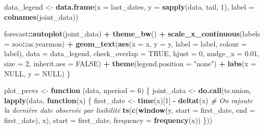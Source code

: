 \documentclass[
  12pt,
  a4paper,french]{article}
\newenvironment{Shaded}{\begin{snugshade}}{\end{snugshade}}
\newcommand{\AttributeTok}[1]{\textcolor[rgb]{0.13,0.29,0.53}{#1}}
\newcommand{\CommentTok}[1]{\textcolor[rgb]{0.56,0.35,0.01}{\textit{#1}}}
\newcommand{\ConstantTok}[1]{\textcolor[rgb]{0.56,0.35,0.01}{#1}}
\newcommand{\ControlFlowTok}[1]{\textcolor[rgb]{0.13,0.29,0.53}{\textbf{#1}}}
\newcommand{\DecValTok}[1]{\textcolor[rgb]{0.00,0.00,0.81}{#1}}
\newcommand{\FloatTok}[1]{\textcolor[rgb]{0.00,0.00,0.81}{#1}}
\newcommand{\FunctionTok}[1]{\textcolor[rgb]{0.13,0.29,0.53}{\textbf{#1}}}
\newcommand{\NormalTok}[1]{#1}
\newcommand{\OtherTok}[1]{\textcolor[rgb]{0.56,0.35,0.01}{#1}}
\newcommand{\SpecialCharTok}[1]{\textcolor[rgb]{0.81,0.36,0.00}{\textbf{#1}}}
\newcommand{\StringTok}[1]{\textcolor[rgb]{0.31,0.60,0.02}{#1}}
\newcommand\1{\mathds{1}}
\begin{document}
\begin{Shaded}
\begin{Highlighting}[]
\NormalTok{  data\_legend }\OtherTok{\textless{}{-}} 
    \FunctionTok{data.frame}\NormalTok{(}\AttributeTok{x =}\NormalTok{ last\_dates,}
               \AttributeTok{y =} \FunctionTok{sapply}\NormalTok{(data, tail, }\DecValTok{1}\NormalTok{),}
               \AttributeTok{label =} \FunctionTok{colnames}\NormalTok{(joint\_data))}
  
\NormalTok{  forecast}\SpecialCharTok{::}\FunctionTok{autoplot}\NormalTok{(joint\_data) }\SpecialCharTok{+} \FunctionTok{theme\_bw}\NormalTok{() }\SpecialCharTok{+}
    \FunctionTok{scale\_x\_continuous}\NormalTok{(}\AttributeTok{labels =}\NormalTok{ zoo}\SpecialCharTok{::}\NormalTok{as.yearmon) }\SpecialCharTok{+}
    \FunctionTok{geom\_text}\NormalTok{(}\FunctionTok{aes}\NormalTok{(}\AttributeTok{x =}\NormalTok{ x, }\AttributeTok{y =}\NormalTok{ y, }\AttributeTok{label =}\NormalTok{ label, }\AttributeTok{colour =}\NormalTok{ label), }
              \AttributeTok{data =}\NormalTok{ data\_legend,}
              \AttributeTok{check\_overlap =} \ConstantTok{TRUE}\NormalTok{, }\AttributeTok{hjust =} \DecValTok{0}\NormalTok{, }\AttributeTok{nudge\_x =} \FloatTok{0.01}\NormalTok{,}
              \AttributeTok{size =} \DecValTok{2}\NormalTok{, }\AttributeTok{inherit.aes =} \ConstantTok{FALSE}\NormalTok{) }\SpecialCharTok{+}
    \FunctionTok{theme}\NormalTok{(}\AttributeTok{legend.position =} \StringTok{"none"}\NormalTok{)  }\SpecialCharTok{+}
    \FunctionTok{labs}\NormalTok{(}\AttributeTok{x =} \ConstantTok{NULL}\NormalTok{, }\AttributeTok{y =} \ConstantTok{NULL}\NormalTok{)}
\NormalTok{\}}

\NormalTok{plot\_prevs }\OtherTok{\textless{}{-}} \ControlFlowTok{function}\NormalTok{ (data, }\AttributeTok{nperiod =} \DecValTok{6}\NormalTok{) \{}
\NormalTok{  joint\_data }\OtherTok{\textless{}{-}} \FunctionTok{do.call}\NormalTok{(ts.union, }\FunctionTok{lapply}\NormalTok{(data, }\ControlFlowTok{function}\NormalTok{(x) \{}
\NormalTok{    first\_date }\OtherTok{\textless{}{-}} \FunctionTok{time}\NormalTok{(x)[}\DecValTok{1}\NormalTok{] }\SpecialCharTok{{-}} \FunctionTok{deltat}\NormalTok{(x)}
    \CommentTok{\# On rajoute la dernière date observée par lisibilité}
    \FunctionTok{ts}\NormalTok{(}\FunctionTok{c}\NormalTok{(}\FunctionTok{window}\NormalTok{(y, }\AttributeTok{start =}\NormalTok{ first\_date, }\AttributeTok{end =}\NormalTok{ first\_date), x), }
       \AttributeTok{start =}\NormalTok{ first\_date, }\AttributeTok{frequency =} \FunctionTok{frequency}\NormalTok{(x))}
\NormalTok{  \}))}
  

\end{Highlighting}
\end{Shaded}
\end{document}
